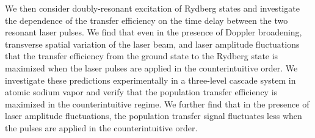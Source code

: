 We then consider doubly-resonant excitation of Rydberg states and investigate
the dependence of the transfer efficiency on the time delay between the two
resonant laser pulses.  We find that even in the presence of Doppler broadening,
transverse spatial variation of the laser beam, and laser amplitude fluctuations
that the transfer efficiency from the ground state to the Rydberg state is
maximized when the laser pulses are applied in the counterintuitive order.  We
investigate these predictions experimentally in a three-level cascade system in
atomic sodium vapor and verify that the population transfer efficiency is
maximized in the counterintuitive regime.  We further find that in the
presence of laser amplitude fluctuations, the population transfer signal
fluctuates less when the pulses are applied in the counterintuitive order.

%

